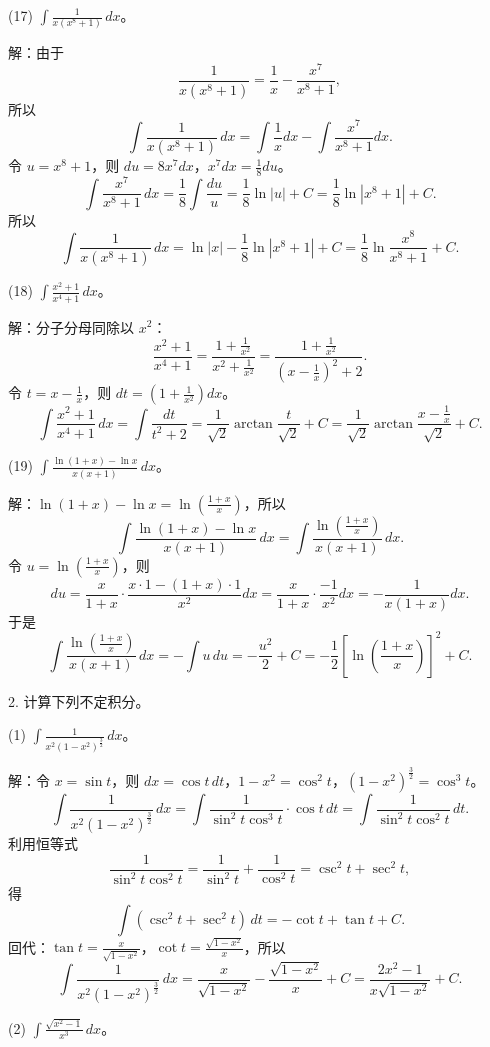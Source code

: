(17) \(\int\frac{1}{x(x^{8}+1)}\,dx\)。

解：由于
\[ \frac{1}{x(x^{8}+1)}=\frac{1}{x}-\frac{x^{7}}{x^{8}+1}, \]
所以
\[ \int\frac{1}{x(x^{8}+1)}\,dx=\int\frac{1}{x}dx-\int\frac{x^{7}}{x^{8}+1}dx. \]
令 \(u=x^{8}+1\)，则 \(du=8x^{7}dx\)，\(x^{7}dx=\frac{1}{8}du\)。
\[ \int\frac{x^{7}}{x^{8}+1}\,dx=\frac{1}{8}\int\frac{du}{u}=\frac{1}{8}\ln|u|+C=\frac{1}{8}\ln|x^{8}+1|+C. \]
所以
\[ \int\frac{1}{x(x^{8}+1)}\,dx=\ln|x|-\frac{1}{8}\ln|x^{8}+1|+C=\frac{1}{8}\ln\frac{x^{8}}{x^{8}+1}+C. \]

(18) \(\int\frac{x^{2}+1}{x^{4}+1}\,dx\)。

解：分子分母同除以 \(x^{2}\)：
\[ \frac{x^{2}+1}{x^{4}+1}=\frac{1+\frac{1}{x^{2}}}{x^{2}+\frac{1}{x^{2}}}=\frac{1+\frac{1}{x^{2}}}{\left(x-\frac{1}{x}\right)^{2}+2}. \]
令 \(t=x-\frac{1}{x}\)，则 \(dt=\left(1+\frac{1}{x^{2}}\right)dx\)。
\[ \int\frac{x^{2}+1}{x^{4}+1}\,dx=\int\frac{dt}{t^{2}+2}=\frac{1}{\sqrt{2}}\arctan\frac{t}{\sqrt{2}}+C=\frac{1}{\sqrt{2}}\arctan\frac{x-\frac{1}{x}}{\sqrt{2}}+C. \]

(19) \(\int\frac{\ln(1+x)-\ln x}{x(x+1)}\,dx\)。

解：\(\ln(1+x)-\ln x=\ln\left(\frac{1+x}{x}\right)\)，所以
\[ \int\frac{\ln(1+x)-\ln x}{x(x+1)}\,dx=\int\frac{\ln\left(\frac{1+x}{x}\right)}{x(x+1)}\,dx. \]
令 \(u=\ln\left(\frac{1+x}{x}\right)\)，则
\[ du=\frac{x}{1+x}\cdot\frac{x\cdot 1-(1+x)\cdot 1}{x^{2}}dx=\frac{x}{1+x}\cdot\frac{-1}{x^{2}}dx=-\frac{1}{x(1+x)}dx. \]
于是
\[ \int\frac{\ln\left(\frac{1+x}{x}\right)}{x(x+1)}\,dx=-\int u\,du=-\frac{u^{2}}{2}+C=-\frac{1}{2}\left[\ln\left(\frac{1+x}{x}\right)\right]^{2}+C. \]

2. 计算下列不定积分。

(1) \(\int\frac{1}{x^{2}(1-x^{2})^{\frac{3}{2}}}\,dx\)。

解：令 \(x=\sin t\)，则 \(dx=\cos t\,dt\)，\(1-x^{2}=\cos^{2}t\)，\((1-x^{2})^{\frac{3}{2}}=\cos^{3}t\)。
\[ \int\frac{1}{x^{2}(1-x^{2})^{\frac{3}{2}}}\,dx=\int\frac{1}{\sin^{2}t\cos^{3}t}\cdot\cos t\,dt=\int\frac{1}{\sin^{2}t\cos^{2}t}\,dt. \]
利用恒等式
\[ \frac{1}{\sin^{2}t\cos^{2}t}=\frac{1}{\sin^{2}t}+\frac{1}{\cos^{2}t}=\csc^{2}t+\sec^{2}t, \]
得
\[ \int(\csc^{2}t+\sec^{2}t)\,dt=-\cot t+\tan t+C. \]
回代：\(\tan t=\frac{x}{\sqrt{1-x^{2}}}\)，\(\cot t=\frac{\sqrt{1-x^{2}}}{x}\)，所以
\[ \int\frac{1}{x^{2}(1-x^{2})^{\frac{3}{2}}}\,dx=\frac{x}{\sqrt{1-x^{2}}}-\frac{\sqrt{1-x^{2}}}{x}+C=\frac{2x^{2}-1}{x\sqrt{1-x^{2}}}+C. \]

(2) \(\int\frac{\sqrt{x^{2}-1}}{x^{3}}\,dx\)。

